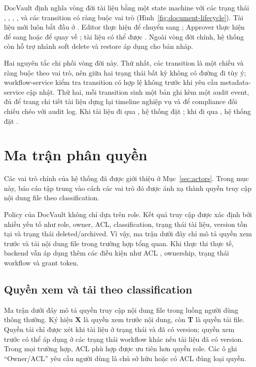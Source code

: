 DocVault định nghĩa vòng đời tài liệu bằng một state machine với các trạng thái , , , ,  và các transition có ràng buộc vai trò (Hình~\ref{fig:document-lifecycle}). Tài liệu mới luôn bắt đầu ở . Editor thực hiện  để chuyển sang ; Approver thực hiện  để sang  hoặc  để quay về ; tài liệu  có thể được . Ngoài vòng đời chính, hệ thống còn hỗ trợ nhánh soft delete và restore áp dụng cho bản nháp.

Hai nguyên tắc chi phối vòng đời này. Thứ nhất, các transition là một chiều và ràng buộc theo vai trò, nên giữa hai trạng thái bất kỳ không có đường đi tùy ý; workflow-service kiểm tra transition có hợp lệ không trước khi yêu cầu metadata-service cập nhật. Thứ hai, mỗi transition sinh một bản ghi  kèm một audit event, đủ để trang chi tiết tài liệu dựng lại timeline nghiệp vụ và để compliance đối chiếu chéo với audit log. Khi tài liệu đi qua , hệ thống đặt ; khi đi qua , hệ thống đặt .

\section{Ma trận phân quyền}

Các vai trò chính của hệ thống đã được giới thiệu ở Mục~\ref{sec:actors}. Trong mục này, báo cáo tập trung vào cách các vai trò đó được ánh xạ thành quyền truy cập nội dung file theo classification.

Policy của DocVault không chỉ dựa trên role. Kết quả truy cập được xác định bởi nhiều yếu tố như role, owner, ACL, classification, trạng thái tài liệu, version tồn tại và trạng thái deleted/archived. Vì vậy, ma trận dưới đây chỉ mô tả quyền xem trước và tải nội dung file trong trường hợp tổng quan. Khi thực thi thực tế, backend vẫn áp dụng thêm các điều kiện như ACL , ownership, trạng thái workflow và grant token.

\subsection{Quyền xem và tải theo classification}

Ma trận dưới đây mô tả quyền truy cập nội dung file trong luồng người dùng thông thường. Ký hiệu \textbf{X} là quyền xem trước nội dung, còn \textbf{T} là quyền tải file. Quyền tải chỉ được xét khi tài liệu ở trạng thái  và đã có version; quyền xem trước có thể áp dụng ở các trạng thái workflow khác nếu tài liệu đã có version. Trong mọi trường hợp, ACL  phù hợp được ưu tiên hơn quyền role. Các ô ghi ``Owner/ACL'' yêu cầu người dùng là chủ sở hữu hoặc có ACL  đúng loại quyền.


